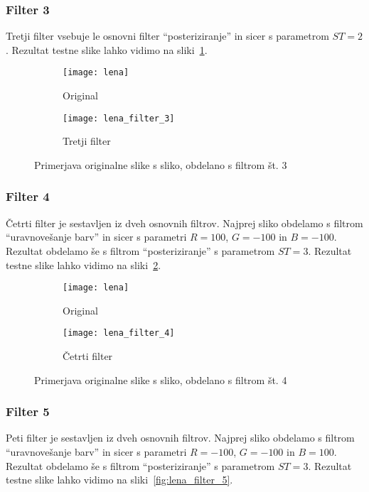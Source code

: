 \subsubsection*{Filter 3}
Tretji filter vsebuje le osnovni filter ``posteriziranje'' in sicer s parametrom
$ST = 2$. Rezultat testne slike lahko vidimo na sliki~\ref{fig:lena_filter_3}.

\begin{figure}[!ht]
    \centering
    \begin{subfigure}[b]{0.4\textwidth}
        \texttt{[image: lena]}
        \caption{Original}
    \end{subfigure}
    \begin{subfigure}[b]{0.4\textwidth}
        \texttt{[image: lena\_filter\_3]}
        \caption{Tretji filter}
    \end{subfigure}
    \caption{Primerjava originalne slike s sliko, obdelano s filtrom št. 3}
    \label{fig:lena_filter_3}
\end{figure}


\subsubsection*{Filter 4}
Četrti filter je sestavljen iz dveh osnovnih filtrov. Najprej sliko obdelamo s
filtrom ``uravnovešanje barv'' in sicer s parametri $R = 100$, $G = -100$ in
$B = -100$. Rezultat obdelamo še s filtrom ``posteriziranje'' s parametrom
$ST = 3$. Rezultat testne slike lahko vidimo na sliki~\ref{fig:lena_filter_4}.

\begin{figure}[!ht]
    \centering
    \begin{subfigure}[b]{0.4\textwidth}
        \texttt{[image: lena]}
        \caption{Original}
    \end{subfigure}
    \begin{subfigure}[b]{0.4\textwidth}
        \texttt{[image: lena\_filter\_4]}
        \caption{Četrti filter}
    \end{subfigure}
    \caption{Primerjava originalne slike s sliko, obdelano s filtrom št. 4}
    \label{fig:lena_filter_4}
\end{figure}


\subsubsection*{Filter 5}
Peti filter je sestavljen iz dveh osnovnih filtrov. Najprej sliko obdelamo s
filtrom ``uravnovešanje barv'' in sicer s parametri $R = -100$, $G = -100$ in
$B = 100$. Rezultat obdelamo še s filtrom ``posteriziranje'' s parametrom
$ST = 3$. Rezultat testne slike lahko vidimo na sliki~\ref{fig:lena_filter_5}.

